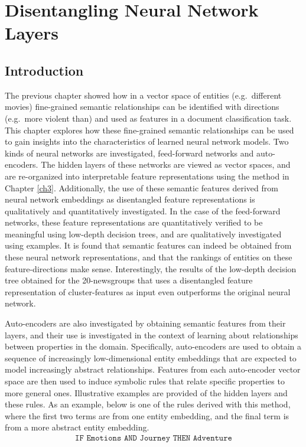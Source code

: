 \chapter{Disentangling Neural Network Layers}\label{ch4}


\section{Introduction}

The previous chapter showed how in a vector space of entities (e.g.\ different movies) fine-grained semantic relationships can be identified with directions (e.g.\ more violent than) and used as features in a document classification task. This chapter explores how these fine-grained semantic relationships can be used to gain insights into the characteristics of learned neural network models. Two kinds of neural networks are investigated, feed-forward networks and auto-encoders. The hidden layers of these networks are viewed as vector spaces, and are re-organized into interpretable feature representations using the method in Chapter \ref{ch3}.  Additionally, the use of these semantic features derived from neural network embeddings as disentangled feature representations  is qualitatively and quantitatively investigated. In the case of the feed-forward networks, these feature representations are quantitatively verified to be meaningful using low-depth decision trees, and are qualitatively investigated using examples. It is found that semantic features can indeed be obtained from these neural network representations, and that the rankings of entities on these feature-directions make sense. Interestingly, the results of the low-depth decision tree obtained for the 20-newsgroups that uses a disentangled feature representation of cluster-features as input even  outperforms the original neural network.


Auto-encoders are also investigated by obtaining semantic features from their  layers, and their use is investigated in the context of learning about relationships between properties in the domain. Specifically, auto-encoders are used to obtain a sequence of increasingly low-dimensional entity embeddings that are expected to model increasingly abstract relationships. Features from each auto-encoder vector space are then used to induce symbolic rules that relate specific properties to more general ones. Illustrative examples are provided of the hidden layers and these rules. As an example, below is one of the rules derived with this method, where the first two terms are from one entity embedding, and the final term is from a more abstract entity embedding.
\begin{align}\label{rule1}\texttt{IF Emotions  AND  Journey THEN Adventure}\end{align} 


